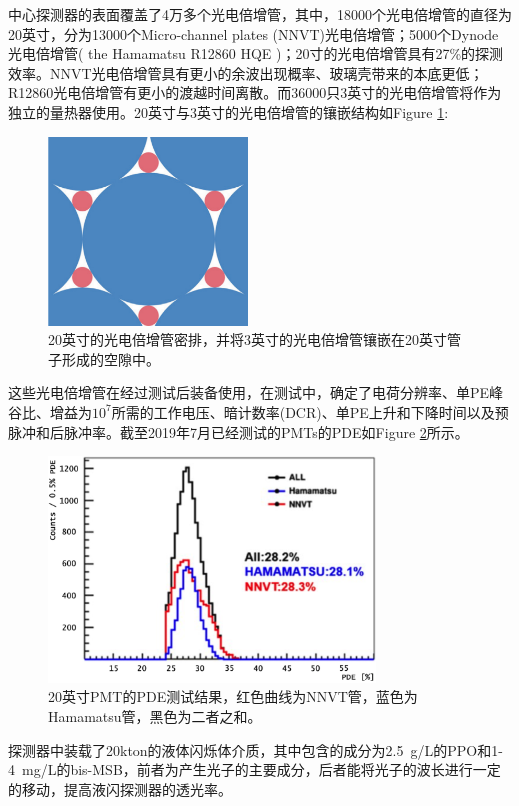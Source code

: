 \documentclass[10pt,a4paper]{article}
\begin{document}
中心探测器的表面覆盖了4万多个光电倍增管，其中，18000个光电倍增管的直径为20英寸，分为13000个Micro-channel plates (NNVT)光电倍增管；5000个Dynode光电倍增管( the Hamamatsu R12860 HQE )；20寸的光电倍增管具有27\%的探测效率。NNVT光电倍增管具有更小的余波出现概率、玻璃壳带来的本底更低；R12860光电倍增管有更小的渡越时间离散。\cite{Steiger:2019khq}而36000只3英寸的光电倍增管将作为独立的量热器使用。20英寸与3英寸的光电倍增管的镶嵌结构如Figure \ref{fig:34}:
\begin{figure}[H]
 \centering
 \includegraphics[height=5cm]{images/PMTsyt.png}
 \caption{20英寸的光电倍增管密排，并将3英寸的光电倍增管镶嵌在20英寸管子形成的空隙中。\cite{Zhang:2017ewk}}
 \label{fig:34}
\end{figure}



这些光电倍增管在经过测试后装备使用，在测试中，确定了电荷分辨率、单PE峰谷比、增益为$10^7$所需的工作电压、暗计数率(DCR)、单PE上升和下降时间以及预脉冲和后脉冲率。截至2019年7月已经测试的PMTs的PDE如Figure \ref{fig:4}所示\cite{Steiger:2019khq}。


\begin{figure}[H]
 \centering
 \includegraphics[height=6cm]{images/pmt测试.png}
 \caption{20英寸PMT的PDE测试结果，红色曲线为NNVT管，蓝色为Hamamatsu管，黑色为二者之和。}
 \label{fig:4}
\end{figure}


探测器中装载了20kton的液体闪烁体介质，其中包含的成分为\SI{2.5}{g/L}的PPO和1-\SI{4}{mg/L}的bis-MSB，前者为产生光子的主要成分，后者能将光子的波长进行一定的移动，提高液闪探测器的透光率。
\end{document}
